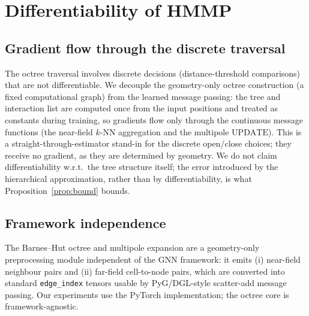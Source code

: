 %

\appendix
\section{Differentiability of HMMP}\label{app:diff}
\subsection{Gradient flow through the discrete traversal}
The octree traversal involves discrete decisions (distance-threshold comparisons) that are
not differentiable. We decouple the geometry-only octree construction (a fixed computational
graph) from the learned message passing: the tree and interaction list are computed once
from the input positions and treated as constants during training, so gradients flow only
through the continuous message functions (the near-field $k$-NN aggregation and the
multipole $\mathrm{UPDATE}$). This is a straight-through-estimator stand-in for the discrete
open/close choices; they receive no gradient, as they are determined by geometry. We do not
claim differentiability w.r.t.\ the tree structure itself; the error introduced by the
hierarchical approximation, rather than by differentiability, is what Proposition~\ref{prop:bound} bounds.

\subsection{Framework independence}
The Barnes--Hut octree and multipole expansion are a geometry-only preprocessing module
independent of the GNN framework: it emits (i) near-field neighbour pairs and (ii) far-field
cell-to-node pairs, which are converted into standard \texttt{edge\_index} tensors usable by
PyG/DGL-style scatter-add message passing. Our experiments use the PyTorch implementation;
the octree core is framework-agnostic.

